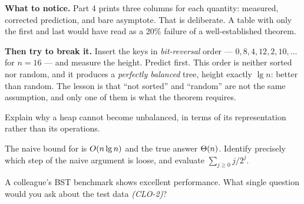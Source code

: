 \begin{lab}
\textbf{What to notice.} Part 4 prints three columns for each quantity:
measured, corrected prediction, and bare asymptote. That is deliberate. A
table with only the first and last would have read as a 20\% failure of a
well-established theorem.

\smallskip
\textbf{Then try to break it.} Insert the keys in \emph{bit-reversal} order ---
$0, 8, 4, 12, 2, 10, \ldots$ for $n = 16$ --- and measure the height. Predict
first. This order is neither sorted nor random, and it produces a
\emph{perfectly balanced} tree, height exactly $\lg n$: better than random. The
lesson is that ``not sorted'' and ``random'' are not the same assumption, and
only one of them is what the theorem requires.
\end{lab}

\begin{checkpoint}
\begin{tightnum}
  \item Explain why a heap cannot become unbalanced, in terms of its
        representation rather than its operations.
  \item The naive bound for  is $O(n\operatorname{lg} n)$ and the
        true answer $\Theta(n)$. Identify precisely which step of the naive
        argument is loose, and evaluate $\sum_{j\ge0} j/2^{j}$.
  \item A colleague's BST benchmark shows excellent performance. What single
        question would you ask about the test data \emph{(CLO-2)}?
\end{tightnum}
\end{checkpoint}

